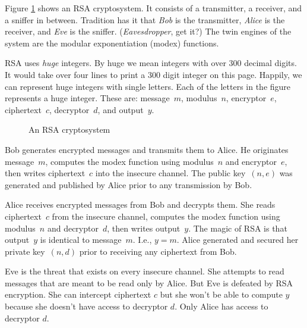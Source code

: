 
Figure \ref{block-diagram} shows an RSA cryptosystem.
It consists of a transmitter, a receiver, and a sniffer in between.
Tradition has it that \emph{Bob} is the transmitter, \emph{Alice} is the receiver,
and \emph{Eve} is the sniffer. (\emph{Eavesdropper}, get it?)
The twin engines of the system are the modular exponentiation (modex) functions.

RSA uses \emph{huge} integers.
By huge we mean integers with over 300 decimal digits.
It would take over four lines to print a 300 digit integer on this page.
Happily, we can represent huge integers with single letters.
Each of the letters in the figure represents a huge integer.
These are: \mbox{message $m$}, \mbox{modulus $n$}, \mbox{encryptor $e$}, 
\mbox{ciphertext $c$}, \mbox{decryptor $d$}, and \mbox{output $y$}.

\vspace{-3ex}
\begin{figure}[h]
\begin{center}

\caption{An RSA cryptosystem}
\label{block-diagram}
\end{center}
\end{figure}

Bob generates encrypted messages and transmits them to Alice.
He originates \mbox{message $m$},
computes the modex function using \mbox{modulus $n$} and \mbox{encryptor $e$},
then writes \mbox{ciphertext $c$} into the insecure channel.
The public \mbox{key $(n,e)$} was generated and published by Alice 
prior to any transmission by Bob.

Alice receives encrypted messages from Bob and decrypts them.
She reads \mbox{ciphertext $c$} from the insecure channel,
computes the modex function using \mbox{modulus $n$} and \mbox{decryptor $d$},
then writes \mbox{output $y$}.
The magic of RSA is that \mbox{output $y$} is identical to \mbox{message $m$}.
I.e., \mbox{$y=m$}.
Alice generated and secured her private \mbox{key $(n,d)$} prior to 
receiving any ciphertext from Bob.

Eve is the threat that exists on every insecure channel.
She attempts to read messages that are meant to be read only by Alice.
But Eve is defeated by RSA encryption.
She can intercept ciphertext $c$ but she won't be able to compute $y$
because she doesn't have access to decryptor $d$.
Only Alice has access to decryptor $d$.

